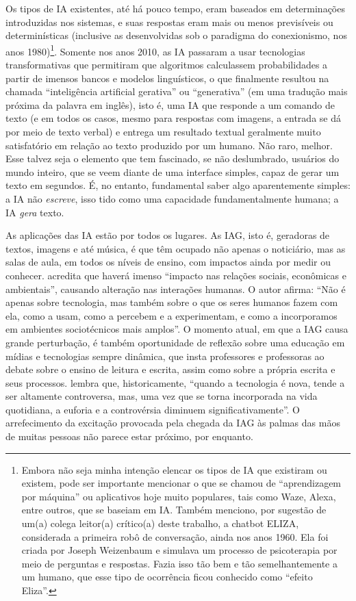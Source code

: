 \documentclass[portuguese]{textolivre}
\begin{document}
Os tipos de IA existentes, até há pouco tempo, eram baseados em determinações introduzidas nos sistemas, e suas respostas eram mais ou menos previsíveis ou determinísticas (inclusive as desenvolvidas sob o paradigma do conexionismo, nos anos 1980)\footnote{Embora não seja minha intenção elencar os tipos de IA que existiram ou existem, pode ser importante mencionar o que se chamou de ``aprendizagem por máquina'' ou aplicativos hoje muito populares, tais como Waze, Alexa, entre outros, que se baseiam em IA. Também menciono, por sugestão de um(a) colega leitor(a) crítico(a) deste trabalho, a chatbot ELIZA, considerada a primeira robô de conversação, ainda nos anos 1960. Ela foi criada por Joseph Weizenbaum e simulava um processo de psicoterapia por meio de perguntas e respostas. Fazia isso tão bem e tão semelhantemente a um humano, que esse tipo de ocorrência ficou conhecido como ``efeito Eliza''.}. Somente nos anos 2010, as IA passaram a usar tecnologias transformativas que permitiram que algoritmos calculassem probabilidades a partir de imensos bancos e modelos linguísticos, o que finalmente resultou na chamada ``inteligência artificial gerativa'' ou ``generativa'' (em uma tradução mais próxima da palavra em inglês), isto é, uma IA que responde a um comando de texto (e em todos os casos, mesmo para respostas com imagens, a entrada se dá por meio de texto verbal) e entrega um resultado textual geralmente muito satisfatório em relação ao texto produzido por um humano. Não raro, melhor. Esse talvez seja o elemento que tem fascinado, se não deslumbrado, usuários do mundo inteiro, que se veem diante de uma interface simples, capaz de gerar um texto em segundos. É, no entanto, fundamental saber algo aparentemente simples: a IA não \textit{escreve}, isso tido como uma capacidade fundamentalmente humana; a IA \textit{gera} texto.

As aplicações das IA estão por todos os lugares. As IAG, isto é, geradoras de textos, imagens e até música, é que têm ocupado não apenas o noticiário, mas as salas de aula, em todos os níveis de ensino, com impactos ainda por medir ou conhecer. \textcite[p. 79]{coeckelbergh2023} acredita que haverá imenso ``impacto nas relações sociais, econômicas e ambientais'', causando alteração nas interações humanas. O autor afirma: ``Não é apenas sobre tecnologia, mas também sobre o que os seres humanos fazem com ela, como a usam, como a percebem e a experimentam, e como a incorporamos em ambientes sociotécnicos mais amplos''. O momento atual, em que a IAG causa grande perturbação, é também oportunidade de reflexão sobre uma educação em mídias e tecnologias sempre dinâmica, que insta professores e professoras ao debate sobre o ensino de leitura e escrita, assim como sobre a própria escrita e seus processos. \textcite[p. 79]{coeckelbergh2023} lembra que, historicamente, ``quando a tecnologia é nova, tende a ser altamente controversa, mas, uma vez que se torna incorporada na vida quotidiana, a euforia e a controvérsia diminuem significativamente''. O arrefecimento da excitação provocada pela chegada da IAG às palmas das mãos de muitas pessoas não parece estar próximo, por enquanto.
\end{document}
